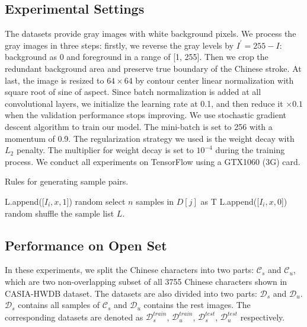 \documentclass[conference]{IEEEtran}
\begin{document}
\subsection{Experimental Settings}
The datasets provide gray images with white background pixels. We process the gray images in three steps: firstly, we reverse the gray levels by $I^{\prime}=255-I$: background as 0 and foreground in a range of [1, 255]. Then we crop the redundant background area and preserve true boundary of the Chinese stroke. At last, the image is resized to $64\times64$ by contour center linear normalization with square root of sine of aspect\cite{liu2004handwritten}. Since batch normalization is added at all convolutional layers, we initialize the learning rate at 0.1, and then reduce it $\times0.1$ when the validation performance stops improving. We use stochastic gradient descent algorithm to train our model. The mini-batch is set to 256 with a momentum of 0.9. The regularization strategy we used is the weight decay with $L_2$ penalty. The multiplier for weight decay is set to $10^{-4}$ during the training process. We conduct all experiments on TensorFlow\cite{abadi2016tensorflow:} using a GTX1060 (3G) card.

\begin{algorithm}[h]
	\caption{Rules for generating sample pairs.}
	\label{sample}
	\begin{algorithmic}
		\STATE L.append([$I_i, x, 1$])
		\ENDFOR
		\ELSE 
		\STATE random select $n$ samples in $D[j]$ as T
		\STATE L.append([$I_i, x, 0$])
		\ENDFOR
		\ENDIF 	
		\ENDFOR
		\ENDFOR
		\STATE random shuffle the sample list $L$. 
	\end{algorithmic}
\end{algorithm}

\subsection{Performance on Open Set}
In these experiments, we split the Chinese characters into two parts: $\mathcal{C}_s$ and $\mathcal{C}_u$, which are two non-overlapping subset of all 3755 Chinese characters shown in CASIA-HWDB dataset. The datasets are also divided into two parts: $\mathcal{D}_s$ and $\mathcal{D}_u$. $\mathcal{D}_s$ contains all samples of $\mathcal{C}_s$ and $\mathcal{D}_u$ contains the rest images. The corresponding datasets are denoted as $\mathcal{D}_s^{train}$, $\mathcal{D}_u^{train}$, $\mathcal{D}_s^{test}$, $\mathcal{D}_u^{test}$ respectively. 
\end{document}
